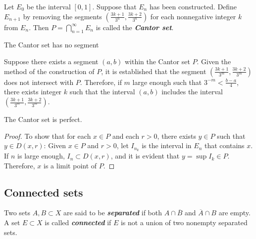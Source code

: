 \begin{definition}[pma 2.44]
Let $E_0$ be the interval $[0,1]$. Suppose that $E_n$ has been constructed. Define $E_{n+1}$ by removing the segments $(\frac{3k+1}{3^n}, \frac{3k+2}{3^n})$ for each nonnegative integer $k$ from $E_n$. Then $P=\bigcap\limits_{n=1}^\infty E_n$ is called the \textbf{\emph{Cantor set}}.
\end{definition}

\begin{theorem}[pma 2.44]
The Cantor set has no segment
\end{theorem}
\begin{hardproof}
Suppose there exists a segment $(a,b)$ within the Cantor set $P$. Given the method of the construction of $P$, it is established that the segment $(\frac{3k+1}{3^m},\frac{3k+2}{3^m})$ does not intersect with $P$. Therefore, if $m$ large enough such that $3^{-m} < \frac{b-a}{4}$, there exists integer $k$ such that the interval $(a,b)$ includes the interval $(\frac{3k+1}{3^m},\frac{3k+2}{3^m})$.
\end{hardproof}

\begin{theorem}[pma 2.44]
The Cantor set is perfect.
\end{theorem}
\begin{proof}
To show that for each $x\in P$ and each $r>0$, there exists $y\in P$ such that $y\in D(x,r)$: Given $x\in P$ and $r>0$, let $I_{n_k}$ is the interval in $E_n$ that contains $x$. If $n$ is large enough, $I_n \subset D(x,r)$, and it is evident that $y=\sup I_k \in P$. Therefore, $x$ is a limit point of $P$.
\end{proof}

\subsection{Connected sets}

\begin{definition}[pma 2.45]
Two sets $A,B\subset X$ are said to be \textbf{\emph{separated}} if both $A\cap \overline{B}$ and $\overline{A}\cap B$ are empty. A set $E\subset X$ is called \textbf{\emph{connected}} if $E$ is not a union of two nonempty separated sets.
\end{definition}

